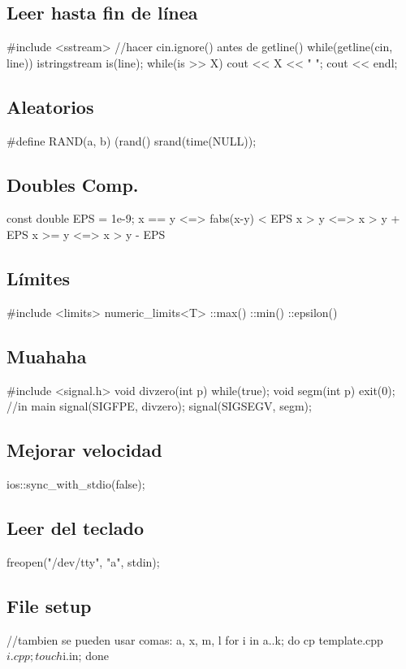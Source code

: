 \subsection*{Leer hasta fin de línea}
\begin{code}
#include <sstream>
//hacer cin.ignore() antes de getline()
while(getline(cin, line)){
   	 istringstream is(line);
   	 while(is >> X)
   		 cout << X << " ";
   	 cout << endl;
}
\end{code}
\subsection*{Aleatorios}
\begin{code}
#define RAND(a, b) (rand()%
srand(time(NULL));
\end{code}
\subsection*{Doubles Comp.}
\begin{code}
const double EPS = 1e-9;
x == y	<=> fabs(x-y) < EPS
x >  y	<=> x > y + EPS
x >= y	<=> x > y - EPS
\end{code}
\subsection*{Límites}
\begin{code}
#include <limits>
numeric_limits<T>
	::max()
	::min()
	::epsilon()
\end{code}
\subsection*{Muahaha}
\begin{code}
#include <signal.h>
void divzero(int p){
	while(true);}
void segm(int p){
	exit(0);}
//in main
signal(SIGFPE, divzero);
signal(SIGSEGV, segm);
\end{code}
\subsection*{Mejorar velocidad}
\begin{code}
ios::sync_with_stdio(false);
\end{code}
\subsection*{Leer del teclado}
\begin{code}
freopen("/dev/tty", "a", stdin);
\end{code}
\subsection*{File setup}
\begin{code}
//tambien se pueden usar comas: {a, x, m, l}
for i in {a..k}; do cp template.cpp $i.cpp; touch $i.in; done
\end{code}

